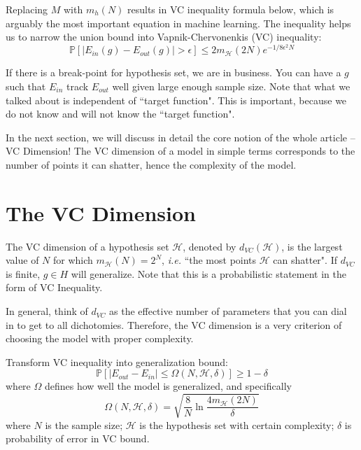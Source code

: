 \documentclass[10pt]{article}
\numberwithin{equation}{section}  %
\begin{document}
Replacing $M$ with $m_h(N)$ results in VC inequality formula below, which is arguably the most important equation in machine learning. The inequality helps us to narrow the union bound into Vapnik-Chervonenkis (VC) inequality:
\begin{equation}\label{eq:vc}
    \mathbb{P}[\vert E_{in}(g)-E_{out}(g)\vert > \epsilon] \leq 2m_\mathcal{H}(2N)e^{-1/8\epsilon^2N}
\end{equation}

If there is a break-point for hypothesis set, we are in business. You can have a $g$ such that $E_{in}$ track $E_{out}$ well given large enough sample size. Note that what we talked about is independent of ``target function". This is important, because we do not know and will not know the ``target function".

In the next section, we will discuss in detail the core notion of the whole article -- VC Dimension! The VC dimension of a model in simple terms corresponds to the number of points it can shatter, hence the complexity of the model.


\section{The VC Dimension}

The VC dimension of a hypothesis set $\mathcal{H}$, denoted by $d_{VC}(\mathcal{H})$, is the largest value of $N$ for which $m_\mathcal{H}(N)=2^N$, \textit{i.e.} ``the most points $\mathcal{H}$ can shatter".
If $d_{VC}$ is finite, $g\in H$ will generalize. Note that this is a probabilistic statement in the form of VC Inequality.

In general, think of $d_{VC}$ as the effective number of parameters that you can dial in to get to all dichotomies. Therefore, the VC dimension is a very criterion of choosing the model with proper complexity.

Transform VC inequality into generalization bound:
\begin{equation}
    \mathbb{P}[\vert E_{out}-E_{in} \vert \leq \Omega(N,\mathcal{H},\delta)]\geq 1-\delta
\end{equation}
where $\Omega$ defines how well the model is generalized, and specifically
\begin{equation}
    \Omega(N,\mathcal{H},\delta)=\sqrt{\frac{8}{N}\ln\frac{4m_\mathcal{H}(2N)}{\delta}}
\end{equation}
where $N$ is the sample size; $\mathcal{H}$ is the hypothesis set with certain complexity; $\delta$ is probability of error in VC bound.
\end{document}
